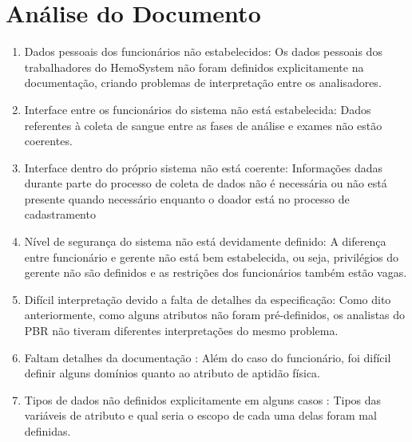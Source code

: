 \documentclass[12pt,a4paper,final]{article}
\begin{document}
\section{Análise do Documento}
\begin{enumerate}
\item Dados pessoais dos funcionários não estabelecidos: Os dados pessoais dos trabalhadores do HemoSystem não foram definidos explicitamente na documentação, criando problemas de interpretação entre os analisadores.

\item Interface entre os funcionários do sistema não está estabelecida: Dados referentes à coleta de sangue entre as fases de análise e exames não estão coerentes.

\item Interface dentro do próprio sistema não está coerente: Informações dadas durante parte do processo de coleta de dados não é necessária ou não está presente quando necessário enquanto o doador está no processo de cadastramento

\item Nível de segurança do sistema não está devidamente definido: A diferença entre funcionário e gerente não está bem estabelecida, ou seja, privilégios do gerente não são definidos e as restrições dos funcionários também estão vagas.

\item Difícil interpretação devido a falta de detalhes da especificação: Como dito anteriormente, como alguns atributos não foram pré-definidos, os analistas do PBR não tiveram diferentes interpretações do mesmo problema.

\item Faltam detalhes da documentação : Além do caso do funcionário, foi difícil definir alguns domínios quanto ao atributo de aptidão física.

\item Tipos de dados não definidos explicitamente em alguns casos : Tipos das variáveis de atributo e qual seria o escopo de cada uma delas foram mal definidas.
\end{enumerate}
\newpage
\end{document}
